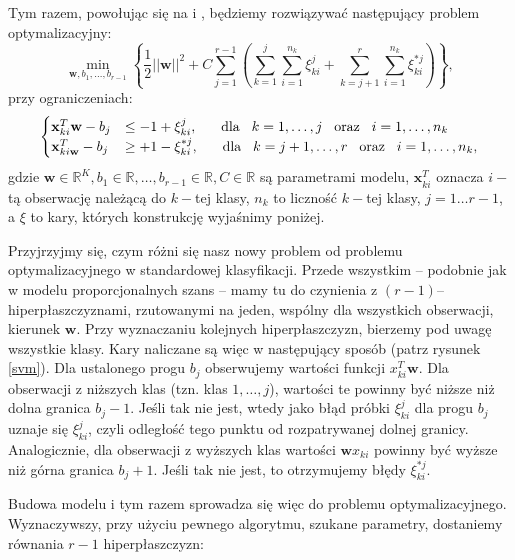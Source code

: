 \documentclass{mini}
\begin{document}
Tym razem, powołując się na \cite{pom} i \cite{svm}, będziemy rozwiązywać następujący problem optymalizacyjny:
$$
\min_{\textbf{w}, b_1, \ldots, b_{r-1}}\left\lbrace \dfrac{1}{2}||\textbf{w}||^2+C\sum_{j=1}^{r-1}\left( \sum_{k=1}^{j}\sum_{i=1}^{n_k}\xi_{ki}^j+\sum_{k=j+1}^{r}\sum_{i=1}^{n_k}\xi_{ki}^{*j}\right)\right\rbrace,
$$
przy ograniczeniach:
$$
\begin{cases}
\mathbf{x}^T_{ki}\textbf{w}-b_j&\leq -1 +\xi^j_{ki}, \hspace{6mm} \textrm{dla}\hspace{3mm} k=1,\ldots,j \hspace{3mm}\textrm{oraz}\hspace{3mm} i=1,\ldots,n_k \\
\mathbf{x}^T_{ki\textbf{w}}-b_j&\geq +1 -\xi^{*j}_{ki}, \hspace{6mm} \textrm{dla}\hspace{3mm} k=j+1,\ldots,r \hspace{3mm}\textrm{oraz}\hspace{3mm} i=1,\ldots,n_k, 
\end{cases}
$$
gdzie $\textbf{w}\in \mathbb{R}^K, b_1\in\mathbb{R}, \ldots, b_{r-1}\in\mathbb{R}, C\in\mathbb{R}$ są parametrami modelu, $\mathbf{x}^T_{ki}$ oznacza $i-$tą obserwację należącą do $k-$tej klasy, $n_k$ to liczność $k-$tej klasy, $j=1\ldots r-1$, a $\xi$ to kary, których konstrukcję wyjaśnimy poniżej.

Przyjrzyjmy się, czym różni się nasz nowy problem od problemu optymalizacyjnego w standardowej klasyfikacji. Przede wszystkim -- podobnie jak w modelu proporcjonalnych szans -- mamy tu do czynienia z $(r-1)$--hiperpłaszczyznami, rzutowanymi na jeden, wspólny dla wszystkich obserwacji, kierunek $\mathbf{w}$. Przy wyznaczaniu kolejnych hiperpłaszczyzn, bierzemy pod uwagę wszystkie klasy. Kary naliczane są więc w następujący sposób (patrz rysunek \ref{svm}). Dla ustalonego progu $b_j$ obserwujemy wartości funkcji $x_{ki}^T\textbf{w}$. Dla obserwacji z niższych klas (tzn. klas $1,\ldots, j$), wartości te powinny być niższe niż dolna granica $b_j-1$. Jeśli tak nie jest, wtedy jako błąd próbki $\xi^j_{ki}$ dla progu $b_j$ uznaje się $\xi^j_{ki}$, czyli odległość tego punktu od rozpatrywanej dolnej granicy. Analogicznie, dla obserwacji z wyższych klas wartości $\textbf{w}x_{ki}$ powinny być wyższe niż górna granica $b_j+1$. Jeśli tak nie jest, to otrzymujemy błędy $\xi^{*j}_{ki}$.

Budowa modelu i tym razem sprowadza się więc do problemu optymalizacyjnego. Wyznaczywszy, przy użyciu pewnego algorytmu, szukane parametry, dostaniemy równania $r-1$ hiperpłaszczyzn:
\end{document}
